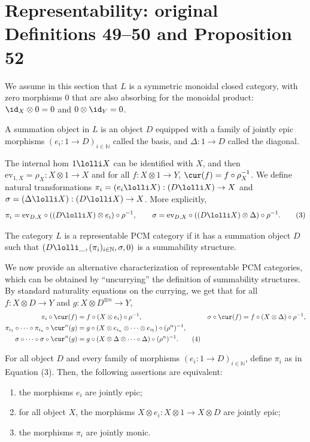 \section*{Representability: original Definitions 49--50 and Proposition 52}
We assume in this section that $L$ is a symmetric monoidal closed category, with zero morphisms $0$ that are also absorbing for the monoidal product: $\id_X\otimes0=0$ and $0\otimes\id_Y=0$.
\begin{originaldef}[49] A summation object in $L$ is an object $D$ equipped with a family of jointly epic morphisms $(e_i:1\to D)_{i\in\mathbb N}$ called the basis, and $\Delta:1\to D$ called the diagonal.\end{originaldef}
The internal hom $1\lolli X$ can be identified with $X$, and then $\mathrm{ev}_{1,X}=\rho_X:X\otimes1\to X$ and for all $f:X\otimes1\to Y$, $\cur(f)=f\circ\rho_X^{-1}$. We define natural transformations $\pi_i=(e_i\lolli X):(D\lolli X)\to X$ and $\sigma=(\Delta\lolli X):(D\lolli X)\to X$. More explicitly,
\[\pi_i=\mathrm{ev}_{D,X}\circ((D\lolli X)\otimes e_i)\circ\rho^{-1},\qquad\sigma=\mathrm{ev}_{D,X}\circ((D\lolli X)\otimes\Delta)\circ\rho^{-1}.\tag{3}\]
\begin{originaldef}[50] The category $L$ is a representable PCM category if it has a summation object $D$ such that $(D\lolli\_,(\pi_i)_{i\in\mathbb N},\sigma,0)$ is a summability structure.\end{originaldef}
We now provide an alternative characterization of representable PCM categories, which can be obtained by ``uncurrying'' the definition of summability structures. By standard naturality equations on the currying, we get that for all $f:X\otimes D\to Y$ and $g:X\otimes D^{\otimes n}\to Y$,
\begin{align*}\pi_i\circ\cur(f)&=f\circ(X\otimes e_i)\circ\rho^{-1},&\sigma\circ\cur(f)&=f\circ(X\otimes\Delta)\circ\rho^{-1},\\\pi_{i_1}\circ\cdots\circ\pi_{i_n}\circ\cur^n(g)&=g\circ(X\otimes e_{i_n}\otimes\cdots\otimes e_{i_1})\circ(\rho^n)^{-1},\\\sigma\circ\cdots\circ\sigma\circ\cur^n(g)&=g\circ(X\otimes\Delta\otimes\cdots\circ\Delta)\circ(\rho^n)^{-1}.\tag{4}\end{align*}
\begin{originallemma}[51] For all object $D$ and every family of morphisms $(e_i:1\to D)_{i\in\mathbb N}$, define $\pi_i$ as in Equation (3). Then, the following assertions are equivalent:
\begin{enumerate}\item the morphisms $e_i$ are jointly epic;\item for all object $X$, the morphisms $X\otimes e_i:X\otimes1\to X\otimes D$ are jointly epic;\item the morphisms $\pi_i$ are jointly monic.\end{enumerate}\end{originallemma}
